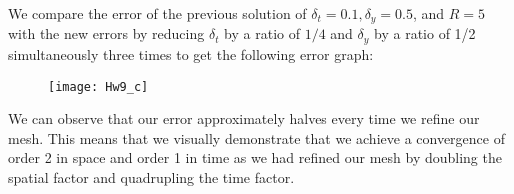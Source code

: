 \documentclass[12pt,twoside, letter]{exam}
\theoremstyle{definition}
\begin{document}
\begin{enumerate}
      \begin{solution}
        We compare the error of the previous solution of $\delta_t = 0.1, \delta_y = 0.5$, and $R = 5$ with the
        new errors by reducing $\delta_t$ by a ratio of $1/4$ and $\delta_y$ by a ratio of 1/2 simultaneously
        three times to get the following error graph: 
        \begin{figure}[H]
          \centering
            \texttt{[image: Hw9\_c]}
        \end{figure}
        We can observe that our error approximately halves every time we refine our mesh. This means that we visually demonstrate
        that we achieve a convergence of order 2 in space and order 1 in time as we had refined our mesh by doubling the
        spatial factor and quadrupling the time factor.
      \end{solution}
\end{enumerate}
\end{document}
